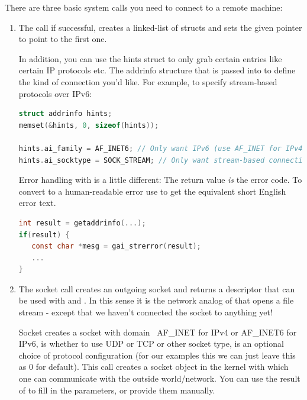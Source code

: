 There are three basic system calls you need to connect to a remote machine:

\begin{enumerate}

\item {}

The  call if successful, creates a linked-list of  structs and sets the given pointer to point to the first one.

In addition, you can use the hints struct to only grab certain entries like certain IP protocols etc. The addrinfo structure that is passed into  to define the kind of connection you'd like.
For example, to specify stream-based protocols over IPv6:

\begin{lstlisting}[language=C]
struct addrinfo hints;
memset(&hints, 0, sizeof(hints));

hints.ai_family = AF_INET6; // Only want IPv6 (use AF_INET for IPv4)
hints.ai_socktype = SOCK_STREAM; // Only want stream-based connection
\end{lstlisting}
Error handling with  is a little different: The return value \emph{is} the error code. To convert to a human-readable error use  to get the equivalent short English error text.

\begin{lstlisting}[language=C]
int result = getaddrinfo(...);
if(result) { 
   const char *mesg = gai_strerror(result); 
   ...
}
\end{lstlisting}


\item {}

The socket call creates an outgoing socket and returns a descriptor that can be used with  and .
In this sense it is the network analog of  that opens a file stream - except that we haven't connected the socket to anything yet!

Socket creates a socket with domain
~AF\_INET for IPv4 or AF\_INET6 for IPv6,  is whether to use UDP or TCP or other socket type,  is an optional choice of protocol configuration (for our examples this we can just leave this as 0 for default).
This call creates a socket object in the kernel with which one can communicate with the outside world/network.
You can use the result of  to fill in the  parameters, or provide them manually.


\end{enumerate}
